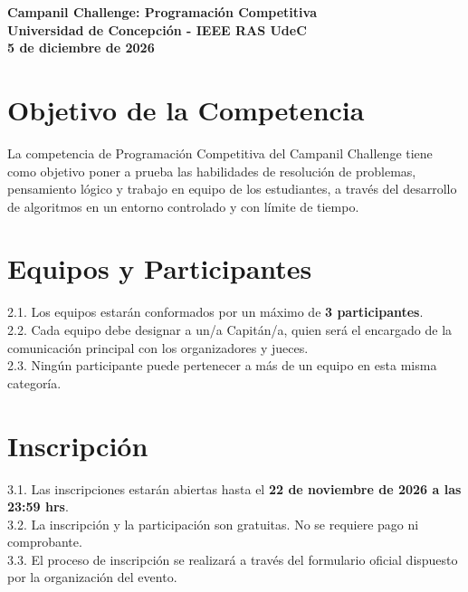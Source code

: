 \documentclass[12pt,a4paper]{article}
\begin{document}
\begin{center}
\vspace*{1cm}
{\LARGE \textbf{Campanil Challenge: Programación Competitiva}} \\
\vspace{0.5cm}
{\large \textbf{Universidad de Concepción - IEEE RAS UdeC}} \\
{\large \textbf{5 de diciembre de 2026}} \\
\end{center}
\vspace{1cm}

\section{Objetivo de la Competencia}
La competencia de Programación Competitiva del Campanil Challenge tiene como objetivo poner a prueba las habilidades de resolución de problemas, pensamiento lógico y trabajo en equipo de los estudiantes, a través del desarrollo de algoritmos en un entorno controlado y con límite de tiempo.

\section{Equipos y Participantes}
2.1. Los equipos estarán conformados por un máximo de \textbf{3 participantes}. \\
2.2. Cada equipo debe designar a un/a Capitán/a, quien será el encargado de la comunicación principal con los organizadores y jueces. \\
2.3. Ningún participante puede pertenecer a más de un equipo en esta misma categoría.

\section{Inscripción}
3.1. Las inscripciones estarán abiertas hasta el \textbf{22 de noviembre de 2026 a las 23:59 hrs}. \\
3.2. La inscripción y la participación son gratuitas. No se requiere pago ni comprobante. \\
3.3. El proceso de inscripción se realizará a través del formulario oficial dispuesto por la organización del evento.
\end{document}
